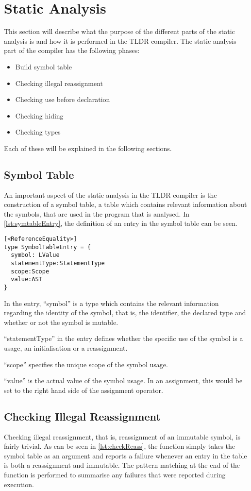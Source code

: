 \section{Static Analysis}
This section will describe what the purpose of the different parts of the static analysis is and how it is performed in the TLDR compiler.
The static analysis part of the compiler has the following phases:
\begin{itemize}
\item Build symbol table
\item Checking illegal reassignment
\item Checking use before declaration
\item Checking hiding
\item Checking types
\end{itemize}
Each of these will be explained in the following sections.
\subsection{Symbol Table}
An important aspect of the static analysis in the TLDR compiler is the construction of a symbol table, a table which contains relevant information about the symbols, that are used in the program that is analysed.
In \cref{lst:symtableEntry}, the definition of an entry in the symbol table can be seen.
\begin{lstlisting}[style = fsharp, label = lst:symtableEntry, caption = {The definition of an entry in the symbol table.}]
[<ReferenceEquality>]
type SymbolTableEntry = {
  symbol: LValue
  statementType:StatementType
  scope:Scope
  value:AST
}
\end{lstlisting}
In the entry, \enquote{symbol} is a type which contains the relevant information regarding the identity of the symbol, that is, the identifier, the declared type and whether or not the symbol is mutable.

\enquote{statementType} in the entry defines whether the specific use of the symbol is a usage, an initialisation or a reassignment.

\enquote{scope} specifies the unique scope of the symbol usage.

\enquote{value} is the actual value of the symbol usage. In an assignment, this would be set to the right hand side of the assignment operator.

\subsection{Checking Illegal Reassignment}
Checking illegal reassignment, that is, reassignment of an immutable symbol, is fairly trivial. As can be seen in \cref{lst:checkReass}, the function simply takes the symbol table as an argument and reports a failure whenever an entry in the table is both a reassignment and immutable.
The pattern matching at the end of the function is performed to summarise any failures that were reported during execution.

